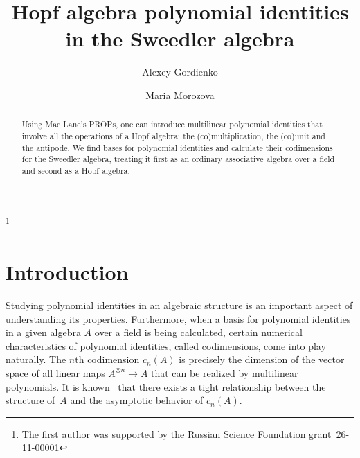 \documentclass[12pt, reqno, a4paper]{amsart}
\makeatletter
\theoremstyle{plain}
\theoremstyle{remark}
\theoremstyle{definition}
\numberwithin{equation}{section}
\DeclareRobustCommand{\No}{\ifmmode{\nfss@text{\textnumero}}\else\textnumero\fi}
\makeatother
\begin{document}
\title[Hopf algebra polynomial identities in the Sweedler algebra]{Hopf algebra polynomial identities in the Sweedler algebra}

\author{Alexey Gordienko}


\author{Maria Morozova}


\address{Department of Higher Algebra,
	Faculty of Mechanics and  Mathematics,
	M.\,V.~Lomonosov Moscow State University,
	Leninskiye Gory, d.1,  Main Building, GSP-1, 119991 Moskva, Russia }




\begin{abstract} Using Mac Lane's PROPs, one can introduce multilinear polynomial identities that involve all the operations of a Hopf algebra: the (co)multiplication, the (co)unit and the antipode. We find bases for polynomial identities and calculate their codimensions for the Sweedler algebra, treating it first as an ordinary associative algebra over a field and second as a Hopf algebra.	
\end{abstract}


\thanks{The first author was supported by the Russian Science Foundation grant \No\,26-11-00001}

\maketitle




\section{Introduction}
Studying polynomial identities in an algebraic structure is an important aspect of understanding its properties.
Furthermore, when a basis for polynomial identities in a given algebra $A$ over a field is being calculated, certain numerical characteristics of polynomial identities, called codimensions, come into play naturally. The $n$th codimension $c_n(A)$ is precisely the dimension of the vector space of all linear maps $A^{\otimes n} \to A$ that can be realized by multilinear polynomials.
It is known~\cite[Section~6.2]{GiaZai} that there exists a tight relationship between the structure of~$A$ and the asymptotic behavior of  $c_n(A)$.
\end{document}
